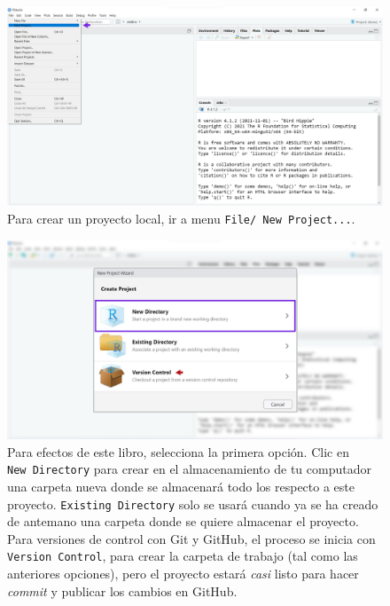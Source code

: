 \documentclass[
]{article}
\theoremstyle{definition}
\theoremstyle{definition}
\theoremstyle{definition}
\theoremstyle{definition}
\theoremstyle{remark}
\begin{document}
\begin{figure}

{\centering \includegraphics[width=1\linewidth]{figs/screenshots/proyectos1} 

}

\caption{Para crear un proyecto local, ir a menu \texttt{File/\ New\ Project...}.}\label{fig:figura30}
\end{figure}



\begin{figure}

{\centering \includegraphics[width=1\linewidth]{figs/screenshots/proyectos2} 

}

\caption{Para efectos de este libro, selecciona la primera opción. Clic en \texttt{New\ Directory} para crear en el almacenamiento de tu computador una carpeta nueva donde se almacenará todo los respecto a este proyecto. \texttt{Existing\ Directory} solo se usará cuando ya se ha creado de antemano una carpeta donde se quiere almacenar el proyecto. Para versiones de control con Git y GitHub, el proceso se inicia con \texttt{Version\ Control}, para crear la carpeta de trabajo (tal como las anteriores opciones), pero el proyecto estará \emph{casi} listo para hacer \emph{commit} y publicar los cambios en GitHub.}\label{fig:figura31}
\end{figure}
\end{document}
